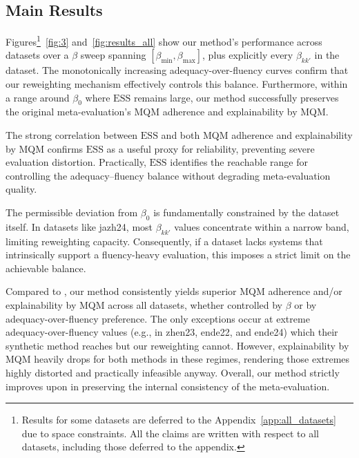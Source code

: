 \documentclass[11pt]{article}
\begin{document}
\subsection{Main Results}
\label{sec:results}

Figures\footnote{Results for some datasets are deferred to the Appendix~\ref{app:all_datasets} due to space constraints. All the claims are written with respect to all datasets, including those deferred to the appendix.}~\ref{fig:3} and~\ref{fig:results_all} show our method's performance across datasets over a $\beta$ sweep spanning $[\beta_{\min}, \beta_{\max}]$, plus explicitly every $\beta_{kk'}$ in the dataset. The monotonically increasing adequacy-over-fluency curves confirm that our reweighting mechanism effectively controls this balance. Furthermore, within a range around $\beta_0$ where $\mathrm{ESS}$ remains large, our method successfully preserves the original meta-evaluation's MQM adherence and explainability by MQM.

The strong correlation between $\mathrm{ESS}$ and both MQM adherence and explainability by MQM confirms $\mathrm{ESS}$ as a useful proxy for reliability, preventing severe evaluation distortion. Practically, $\mathrm{ESS}$ identifies the reachable range for controlling the adequacy--fluency balance without degrading meta-evaluation quality.

The permissible deviation from $\beta_0$ is fundamentally constrained by the dataset itself. In datasets like jazh24, most $\beta_{kk'}$ values concentrate within a narrow band, limiting reweighting capacity. Consequently, if a dataset lacks systems that intrinsically support a fluency-heavy evaluation, this imposes a strict limit on the achievable balance. 

Compared to \citet{shayegh-etal-2025-feeding}, our method consistently yields superior MQM adherence and/or explainability by MQM across all datasets, whether controlled by $\beta$ or by adequacy-over-fluency preference. The only exceptions occur at extreme adequacy-over-fluency values (e.g., in zhen23, ende22, and ende24) which their synthetic method reaches but our reweighting cannot. However, explainability by MQM heavily drops for both methods in these regimes, rendering those extremes highly distorted and practically infeasible anyway. Overall, our method strictly improves upon \citet{shayegh-etal-2025-feeding} in preserving the internal consistency of the meta-evaluation.
\end{document}
